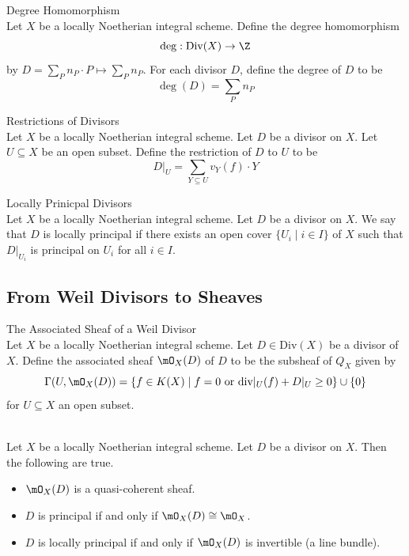 \documentclass[a4paper]{article}
\begin{document}
\begin{defn}{Degree Homomorphism}{}\\
Let $X$ be a locally Noetherian integral scheme. Define the degree homomorphism $$\deg:\text{Div}(X)\to\Z$$ by $D=\sum_Pn_P\cdot P\mapsto\sum_Pn_P$. For each divisor $D$, define the degree of $D$ to be $$\deg(D)=\sum_Pn_P$$
\end{defn}

\begin{defn}{Restrictions of Divisors}{}\\
Let $X$ be a locally Noetherian integral scheme. Let $D$ be a divisor on $X$. Let $U\subseteq X$ be an open subset. Define the restriction of $D$ to $U$ to be $$D|_U=\sum_{Y\subseteq U}v_Y(f)\cdot Y$$
\end{defn}

\begin{defn}{Locally Prinicpal Divisors}{}\\
Let $X$ be a locally Noetherian integral scheme. Let $D$ be a divisor on $X$. We say that $D$ is locally principal if there exists an open cover $\{U_i\;|\;i\in I\}$ of $X$ such that $D|_{U_i}$ is principal on $U_i$ for all $i\in I$. 
\end{defn}

\subsection{From Weil Divisors to Sheaves}
\begin{defn}{The Associated Sheaf of a Weil Divisor}{}\\
Let $X$ be a locally Noetherian integral scheme. Let $D\in\text{Div}(X)$ be a divisor of $X$. Define the associated sheaf $\mO_X(D)$ of $D$ to be the subsheaf of $Q_X$ given by $$\Gamma(U,\mO_X(D))=\{f\in K(X)\;|\;f=0\text{ or }\text{div}|_U(f)+D|_U\geq 0\}\cup\{0\}$$ for $U\subseteq X$ an open subset. 
\end{defn}

\begin{lmm}{}{}\\
Let $X$ be a locally Noetherian integral scheme. Let $D$ be a divisor on $X$. Then the following are true. 
\begin{itemize}
\item $\mO_X(D)$ is a quasi-coherent sheaf. 
\item $D$ is principal if and only if $\mO_X(D)\cong\mO_X$. 
\item $D$ is locally principal if and only if $\mO_X(D)$ is invertible (a line bundle). 
\end{itemize}
\end{lmm}
\end{document}
